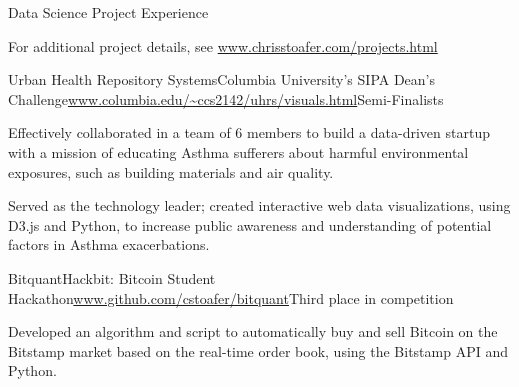 \documentclass{resume} %
\begin{document}
\begin{rSection}{Data Science Project Experience}

For additional project details, see \url{www.chrisstoafer.com/projects.html}

\begin{rSubsection}{Urban Health Repository Systems}{Columbia University's SIPA Dean's Challenge}{\url{www.columbia.edu/~ccs2142/uhrs/visuals.html}}{Semi-Finalists}
\item	Effectively collaborated in a team of 6 members to build a data-driven startup with a mission of educating Asthma sufferers about harmful environmental exposures, such as building materials and air quality.
\item	Served as the technology leader; created interactive web data visualizations, using D3.js and Python, to increase public awareness and understanding of potential factors in Asthma exacerbations.
\end{rSubsection}

\begin{rSubsection}{Bitquant}{Hackbit: Bitcoin Student Hackathon}{\url{www.github.com/cstoafer/bitquant}}{Third place in competition}
\item	Developed an algorithm and script to automatically buy and sell Bitcoin on the Bitstamp market based on the real-time order book, using the Bitstamp API and Python.
\end{rSubsection}

\end{rSection}




\end{document}
